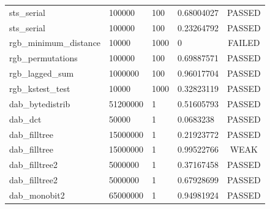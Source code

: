 \documentclass[titlepage, 11pt]{article}
\begin{document}
\begin{table}[!htb]
\begin{tabular}{l|l|l|l|c}
sts\_serial & 100000 & 100 & 0.68004027 & PASSED \\
sts\_serial & 100000 & 100 & 0.23264792 & PASSED \\
rgb\_minimum\_distance & 10000 & 1000 & 0 & FAILED \\
rgb\_permutations & 100000 & 100 & 0.69887571 & PASSED \\
rgb\_lagged\_sum & 1000000 & 100 & 0.96017704 & PASSED \\
rgb\_kstest\_test & 10000 & 1000 & 0.32823119 & PASSED \\
dab\_bytedistrib & 51200000 & 1 & 0.51605793 & PASSED \\
dab\_dct & 50000 & 1 & 0.0683238 & PASSED \\
dab\_filltree & 15000000 & 1 & 0.21923772 & PASSED \\
dab\_filltree & 15000000 & 1 & 0.99522766 & WEAK \\
dab\_filltree2 & 5000000 & 1 & 0.37167458 & PASSED \\
dab\_filltree2 & 5000000 & 1 & 0.67928699 & PASSED \\
dab\_monobit2 & 65000000 & 1 & 0.94981924 & PASSED
\end{tabular}
\end{table}
\end{document}

